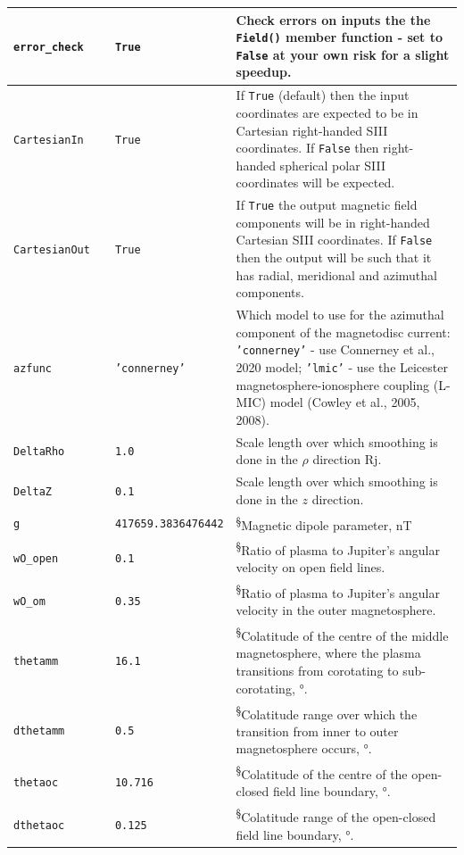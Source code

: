 \begin{table}[h]
\begin{tabular}{|l|l|l|l|}
	\texttt{error\_check} &  & \texttt{True} & Check errors on inputs the the \texttt{Field()} member function - set to \texttt{False} at your own risk for a slight speedup. \\ \hline
	\texttt{CartesianIn} &  & \texttt{True} & If \texttt{True} (default) then the input coordinates are expected to be in Cartesian right-handed SIII coordinates. If \texttt{False} then right-handed spherical polar SIII coordinates will be expected. \\ \hline
	\texttt{CartesianOut} &  & \texttt{True} & If \texttt{True} the output magnetic field components will be in right-handed Cartesian SIII coordinates. If \texttt{False} then the output will be such that it has radial, meridional and azimuthal components. \\ \hline
	\texttt{azfunc} &  & \texttt{'connerney'} & Which model to use for the azimuthal component of the magnetodisc current: \texttt{'connerney'} - use Connerney et al., 2020 model; \texttt{'lmic'} - use the Leicester magnetosphere-ionosphere coupling (L-MIC) model (Cowley et al., 2005, 2008). \\ \hline
	\texttt{DeltaRho} &  & \texttt{1.0} & Scale length over which smoothing is done in the $\rho$ direction Rj. \\ \hline
	\texttt{DeltaZ} &  & \texttt{0.1} & Scale length over which smoothing is done in the $z$ direction. \\ \hline
	\texttt{g} &  & \texttt{417659.3836476442} & \textsuperscript{§}Magnetic dipole parameter, nT \\ \hline
	\texttt{wO\_open} &  & \texttt{0.1} & \textsuperscript{§}Ratio of plasma to Jupiter's angular velocity on open field lines. \\ \hline
	\texttt{wO\_om} &  & \texttt{0.35} & \textsuperscript{§}Ratio of plasma to Jupiter's angular velocity in the outer magnetosphere. \\ \hline
	\texttt{thetamm} &  & \texttt{16.1} & \textsuperscript{§}Colatitude of the centre of the middle magnetosphere, where the plasma transitions from corotating to sub-corotating, °. \\ \hline
	\texttt{dthetamm} & & \texttt{0.5} & \textsuperscript{§}Colatitude range over which the transition from inner to outer magnetosphere occurs, °. \\ \hline
	\texttt{thetaoc} &  & \texttt{10.716} & \textsuperscript{§}Colatitude of the centre of the open-closed field line boundary, °. \\ \hline
	\texttt{dthetaoc} & & \texttt{0.125} & \textsuperscript{§}Colatitude range of the open-closed field line boundary, °. \\ \hline
	\end{tabular}
	\end{table}
	
